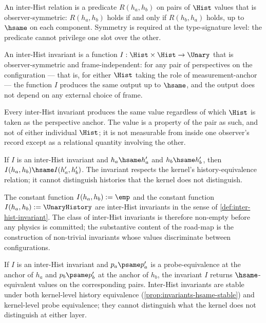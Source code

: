 \begin{definition}
\label{def:inter-hist-relation}
An inter-Hist relation is a predicate \(R(h_a, h_b)\) on pairs of \(\Hist\) values that is observer-symmetric: \(R(h_a, h_b)\) holds if and only if \(R(h_b, h_a)\) holds, up to \(\hsame\) on each component. Symmetry is required at the type-signature level: the predicate cannot privilege one slot over the other.
\end{definition}
\begin{definition}
\label{def:inter-hist-invariant}
An inter-Hist invariant is a function \(I : \Hist \times \Hist \to \Unary\) that is observer-symmetric and frame-independent: for any pair of perspectives on the configuration --- that is, for either \(\Hist\) taking the role of measurement-anchor --- the function \(I\) produces the same output up to \(\hsame\), and the output does not depend on any external choice of frame.
\end{definition}
\begin{theorem}
\label{thm:invariants-observer-independent}
Every inter-Hist invariant produces the same value regardless of which \(\Hist\) is taken as the perspective anchor. The value is a property of the pair as such, and not of either individual \(\Hist\); it is not measurable from inside one observer's record except as a relational quantity involving the other.
\end{theorem}
\begin{proposition}
\label{prop:invariants-hsame-stable}
If \(I\) is an inter-Hist invariant and \(h_a \hsame h_a'\) and \(h_b \hsame h_b'\), then \(I(h_a, h_b) \hsame I(h_a', h_b')\). The invariant respects the kernel's history-equivalence relation; it cannot distinguish histories that the kernel does not distinguish.
\end{proposition}
\begin{lemma}
\label{lem:trivial-invariants-exist}
The constant function \(I(h_a, h_b) := \emp\) and the constant function \(I(h_a, h_b) := \UnaryHistory\) are inter-Hist invariants in the sense of \autoref{def:inter-hist-invariant}. The class of inter-Hist invariants is therefore non-empty before any physics is committed; the substantive content of the road-map is the construction of non-trivial invariants whose values discriminate between configurations.
\end{lemma}
\begin{proposition}
\label{prop:psame-stable}
If \(I\) is an inter-Hist invariant and \(p_a \psame p_a'\) is a probe-equivalence at the anchor of \(h_a\) and \(p_b \psame p_b'\) at the anchor of \(h_b\), the invariant \(I\) returns \(\hsame\)-equivalent values on the corresponding pairs. Inter-Hist invariants are stable under both kernel-level history equivalence (\autoref{prop:invariants-hsame-stable}) and kernel-level probe equivalence; they cannot distinguish what the kernel does not distinguish at either layer.
\end{proposition}

